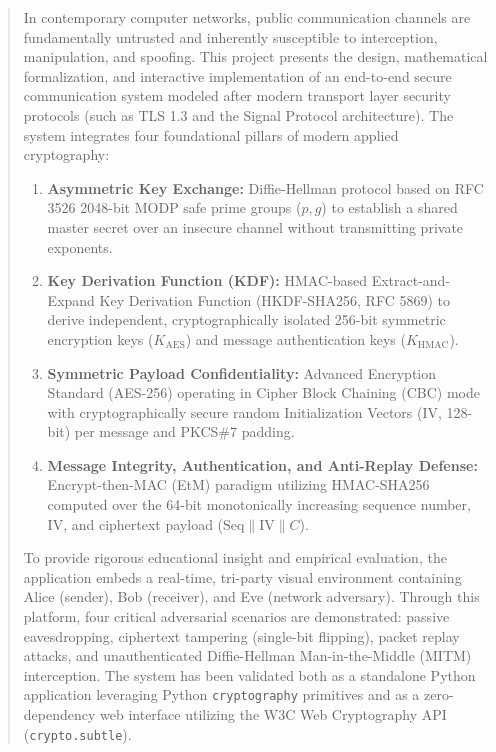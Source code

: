 \documentclass[11pt,a4paper]{article}
\begin{document}

\begin{abstract}
\noindent In contemporary computer networks, public communication channels are fundamentally untrusted and inherently susceptible to interception, manipulation, and spoofing. This project presents the design, mathematical formalization, and interactive implementation of an end-to-end secure communication system modeled after modern transport layer security protocols (such as TLS 1.3 and the Signal Protocol architecture). The system integrates four foundational pillars of modern applied cryptography:
\begin{enumerate}[leftmargin=1.5cm, label=\textbf{\arabic*.}]
    \item \textbf{Asymmetric Key Exchange:} Diffie-Hellman protocol based on RFC 3526 2048-bit MODP safe prime groups ($p, g$) to establish a shared master secret over an insecure channel without transmitting private exponents.
    \item \textbf{Key Derivation Function (KDF):} HMAC-based Extract-and-Expand Key Derivation Function (HKDF-SHA256, RFC 5869) to derive independent, cryptographically isolated 256-bit symmetric encryption keys ($K_{\text{AES}}$) and message authentication keys ($K_{\text{HMAC}}$).
    \item \textbf{Symmetric Payload Confidentiality:} Advanced Encryption Standard (AES-256) operating in Cipher Block Chaining (CBC) mode with cryptographically secure random Initialization Vectors (IV, 128-bit) per message and PKCS\#7 padding.
    \item \textbf{Message Integrity, Authentication, and Anti-Replay Defense:} Encrypt-then-MAC (EtM) paradigm utilizing HMAC-SHA256 computed over the 64-bit monotonically increasing sequence number, IV, and ciphertext payload ($\text{Seq} \parallel \text{IV} \parallel C$).
\end{enumerate}

To provide rigorous educational insight and empirical evaluation, the application embeds a real-time, tri-party visual environment containing Alice (sender), Bob (receiver), and Eve (network adversary). Through this platform, four critical adversarial scenarios are demonstrated: passive eavesdropping, ciphertext tampering (single-bit flipping), packet replay attacks, and unauthenticated Diffie-Hellman Man-in-the-Middle (MITM) interception. The system has been validated both as a standalone Python application leveraging Python \texttt{cryptography} primitives and as a zero-dependency web interface utilizing the W3C Web Cryptography API (\texttt{crypto.subtle}).
\end{abstract}
\end{document}
